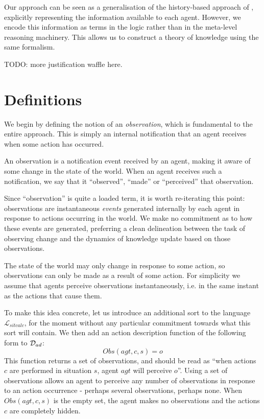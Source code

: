 Our approach can be seen as a generalisation of the history-based
approach of \citep{giacomo99indigolog}, explicitly representing the
information available to each agent. However, we encode this information
as terms in the logic rather than in the meta-level reasoning machinery.
This allows us to construct a theory of knowledge using the same formalism.

TODO: more justification waffle here.


\section{Definitions}

We begin by defining the notion of an \emph{observation}, which is
fundamental to the entire approach\emph{.} This is simply an internal
notification that an agent receives when some action has occurred.

\begin{defnL}
[{Observations}] An observation is a notification event received
by an agent, making it aware of some change in the state of the world.
When an agent receives such a notification, we say that it {}``observed'',
{}``made'' or {}``perceived'' that observation. 
\end{defnL}
Since {}``observation'' is quite a loaded term, it is worth re-iterating
this point: observations are instantaneous \emph{events} generated
internally by each agent in response to actions occurring in the world.
We make no commitment as to how these events are generated, preferring
a clean delineation between the task of observing change and the dynamics
of knowledge update based on those observations.

The state of the world may only change in response to some action,
so observations can only be made as a result of some action. For simplicity
we assume that agents perceive observations instantaneously, i.e.
in the same instant as the actions that cause them.

To make this idea concrete, let us introduce an additional sort 
to the language $\mathcal{L}_{sitcalc}$, for the moment without any
particular commitment towards what this sort will contain. We then
add an action description function of the following form to $\mathcal{D}_{ad}$:\[
Obs(agt,c,s)=o\]
 This function returns a set of observations, and should be read as
{}``when actions $c$ are performed in situation $s$, agent $agt$
will perceive $o$''. Using a set of observations allows an agent
to perceive any number of observations in response to an action occurrence
- perhaps several observations, perhaps none. When $Obs(agt,c,s)$
is the empty set, the agent makes no observations and the actions
$c$ are completely hidden.

